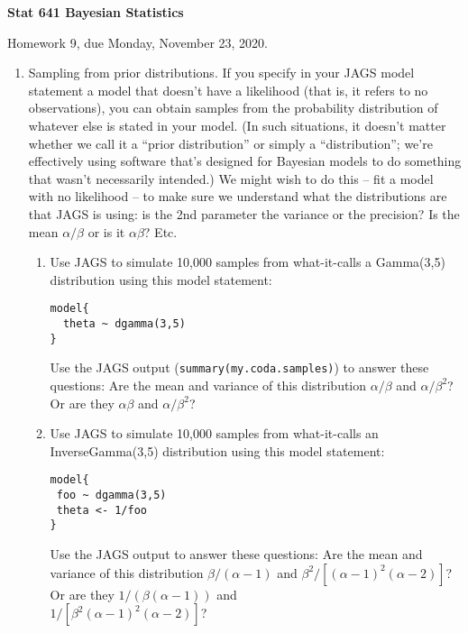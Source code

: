 \documentclass[11pt]{article}
\begin{document}
\setcounter{page}{1}
\thispagestyle{empty}



\begin{center}
{\bf Stat 641 Bayesian Statistics}

Homework 9, due Monday, November 23, 2020.
\end{center}
\noindent
\begin{enumerate}
\item Sampling from prior distributions. If you specify in your JAGS model statement a model that
doesn't have a likelihood (that is, it refers to no observations), you can obtain samples from the
probability distribution of whatever else is stated in your model. (In such situations, it doesn't 
matter whether we call it a ``prior distribution'' or simply a ``distribution''; we're effectively
using software that's designed for Bayesian models to do something that wasn't necessarily intended.)
We might wish to do this -- fit a model with no likelihood -- to make sure we understand what
the distributions are that JAGS is using: is the 2nd parameter the variance or the precision?
Is the mean $\alpha/\beta$ or is it $\alpha \beta$? Etc.

\begin{enumerate}
\item Use JAGS to simulate 10,000 samples from what-it-calls a Gamma(3,5) distribution using this model
statement:
\begin{verbatim}
model{
  theta ~ dgamma(3,5)
}
\end{verbatim}
Use the JAGS output (\verb+summary(my.coda.samples)+) to answer these
questions:
Are the mean and variance of this distribution $\alpha/\beta$ and $\alpha/\beta^2$?
 Or are they $\alpha\beta$ and $\alpha/\beta^2$?

\item Use JAGS to simulate 10,000 samples from what-it-calls an InverseGamma(3,5) distribution using this model
statement:
\begin{verbatim}
model{
 foo ~ dgamma(3,5)
 theta <- 1/foo
}
\end{verbatim}
Use the JAGS output to answer these
questions: Are the mean and variance of this distribution 
$\beta/(\alpha-1)$
and $\beta^2/[(\alpha-1)^2(\alpha-2)]$?
 Or are they
$1/(\beta(\alpha-1))$
and  \\$1/[ \beta^2(\alpha-1)^2(\alpha-2)]$?


\end{enumerate}
\end{enumerate}
\end{document}
